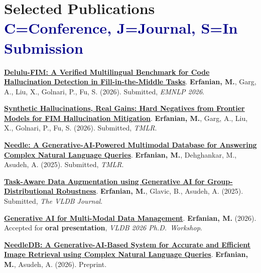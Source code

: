 \documentclass[a4paper,10pt]{article}
\begin{document}
\section{\textbf{Selected Publications} \hfill \textcolor{darkblue}{\scriptsize C=Conference, J=Journal, S=In Submission}}
\small{
\begin{enumerate}[leftmargin=*, labelsep=0.5em, align=left, itemsep=0.4mm, widest={[\textbf{S.1}]}, itemindent=0em, label={\textbf{[\arabic*]}}]

\item[\textbf{[S.1]}] \href{https://arxiv.org/abs/2605.07024}{\textbf{Delulu-FIM: A Verified Multilingual Benchmark for Code Hallucination Detection in Fill-in-the-Middle Tasks}}.
\footnotesize{\textbf{Erfanian, M.}, Garg, A., Liu, X., Golnari, P., Fu, S. (2026). Submitted, \textit{EMNLP 2026}.}

\item[\textbf{[S.2]}] \href{https://scholar.google.com/citations?user=RPhQheUAAAAJ&hl=en}{\textbf{Synthetic Hallucinations, Real Gains: Hard Negatives from Frontier Models for FIM Hallucination Mitigation}}.
\footnotesize{\textbf{Erfanian, M.}, Garg, A., Liu, X., Golnari, P., Fu, S. (2026). Submitted, \textit{TMLR}.}

\item[\textbf{[S.3]}] \href{https://arxiv.org/abs/2412.00639}{\textbf{Needle: A Generative-AI-Powered Multimodal Database for Answering Complex Natural Language Queries}}.
\footnotesize{\textbf{Erfanian, M.}, Dehghankar, M., Asudeh, A. (2025). Submitted, \textit{TMLR}.}

\item[\textbf{[S.4]}] \href{https://scholar.google.com/citations?user=RPhQheUAAAAJ&hl=en}{\textbf{Task-Aware Data Augmentation using Generative AI for Group-Distributional Robustness}}.
\footnotesize{\textbf{Erfanian, M.}, Glavic, B., Asudeh, A. (2025). Submitted, \textit{The VLDB Journal}.}

\item[\textbf{[C.1]}] \href{https://scholar.google.com/citations?user=RPhQheUAAAAJ&hl=en}{\textbf{Generative AI for Multi-Modal Data Management}}.
\footnotesize{\textbf{Erfanian, M.} (2026). Accepted for \textbf{oral presentation}, \textit{VLDB 2026 Ph.D.\ Workshop}.}

\item[\textbf{[S.5]}] \href{https://scholar.google.com/citations?user=RPhQheUAAAAJ&hl=en}{\textbf{NeedleDB: A Generative-AI-Based System for Accurate and Efficient Image Retrieval using Complex Natural Language Queries}}.
\footnotesize{\textbf{Erfanian, M.}, Asudeh, A. (2026). Preprint.}


\end{enumerate}}
\end{document}
